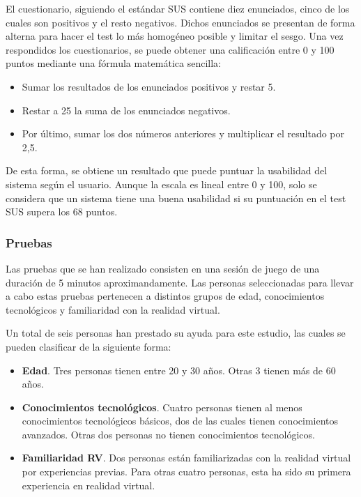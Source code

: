 El cuestionario, siguiendo el estándar SUS contiene diez enunciados, cinco de los cuales son positivos y el resto negativos. Dichos enunciados se presentan de forma alterna para hacer el test lo más homogéneo posible y limitar el sesgo. Una vez respondidos los cuestionarios, se puede obtener una calificación entre 0 y 100 puntos mediante una fórmula matemática sencilla:

\begin{itemize}
	\item{Sumar los resultados de los enunciados positivos y restar 5.}
	
	\item{Restar a 25 la suma de los enunciados negativos.}
	
	\item{Por último, sumar los dos números anteriores y multiplicar el resultado por 2,5.}
	
\end{itemize}

De esta forma, se obtiene un resultado que puede puntuar la usabilidad del sistema según el usuario. Aunque la escala es lineal entre 0 y 100, solo se considera que un sistema tiene una buena usabilidad si su puntuación en el test SUS supera los 68 puntos.

\subsubsection{Pruebas}

Las pruebas que se han realizado consisten en una sesión de juego de una duración de 5 minutos aproximandamente. Las personas seleccionadas para llevar a cabo estas pruebas pertenecen a distintos grupos de edad, conocimientos tecnológicos y familiaridad con la realidad virtual.

Un total de seis personas han prestado su ayuda para este estudio, las cuales se pueden clasificar de la siguiente forma:

\begin{itemize}
	\item{\textbf{Edad}. Tres personas tienen entre 20 y 30 años. Otras 3 tienen más de 60 años.}
	
	\item{\textbf{Conocimientos tecnológicos}. Cuatro personas tienen al menos conocimientos tecnológicos básicos, dos de las cuales tienen conocimientos avanzados. Otras dos personas no tienen conocimientos tecnológicos.}
	
	\item{\textbf{Familiaridad RV}. Dos personas están familiarizadas con la realidad virtual por experiencias previas. Para otras cuatro personas, esta ha sido su primera experiencia en realidad virtual.}
	
\end{itemize}

